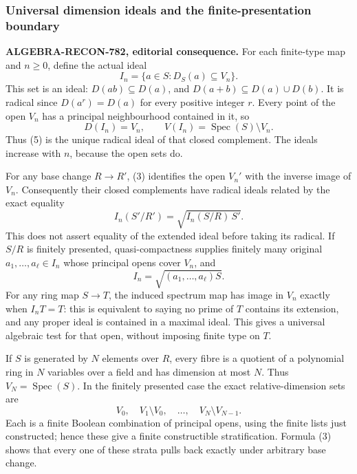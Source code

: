 \subsubsection{Universal dimension ideals and the finite-presentation boundary}\label{algebra-proof-034-universal-dimension-ideals-and-the-finite-presentation-boundary}

\textbf{ALGEBRA-RECON-782, editorial consequence.} For each finite-type map and \(n\geq0\), define the actual ideal \[
 I_n=\{a\in S:D_S(a)\subseteq V_n\}.
 \tag{5}
\] This set is an ideal: \(D(ab)\subseteq D(a)\), and \(D(a+b)\subseteq D(a)\cup D(b)\). It is radical since \(D(a^r)=D(a)\) for every positive integer \(r\). Every point of the open \(V_n\) has a principal neighbourhood contained in it, so \[
 D(I_n)=V_n,\qquad V(I_n)=\operatorname{Spec}(S)\setminus V_n.
\] Thus (5) is the unique radical ideal of that closed complement. The ideals increase with \(n\), because the open sets do.

For any base change \(R\to R'\), (3) identifies the open \(V_n'\) with the inverse image of \(V_n\). Consequently their closed complements have radical ideals related by the exact equality \[
 I_n(S'/R')=\sqrt{I_n(S/R)\,S'}.
 \tag{6}
\] This does not assert equality of the extended ideal before taking its radical. If \(S/R\) is finitely presented, quasi-compactness supplies finitely many original \(a_1,\ldots,a_\ell\in I_n\) whose principal opens cover \(V_n\), and \[
 I_n=\sqrt{(a_1,\ldots,a_\ell)S}.
\] For any ring map \(S\to T\), the induced spectrum map has image in \(V_n\) exactly when \(I_nT=T\): this is equivalent to saying no prime of \(T\) contains its extension, and any proper ideal is contained in a maximal ideal. This gives a universal algebraic test for that open, without imposing finite type on \(T\).

If \(S\) is generated by \(N\) elements over \(R\), every fibre is a quotient of a polynomial ring in \(N\) variables over a field and has dimension at most \(N\). Thus \(V_N=\operatorname{Spec}(S)\). In the finitely presented case the exact relative-dimension sets are \[
 V_0,\quad V_1\setminus V_0,\quad\ldots,\quad V_N\setminus V_{N-1}.
\] Each is a finite Boolean combination of principal opens, using the finite lists just constructed; hence these give a finite constructible stratification. Formula (3) shows that every one of these strata pulls back exactly under arbitrary base change.

